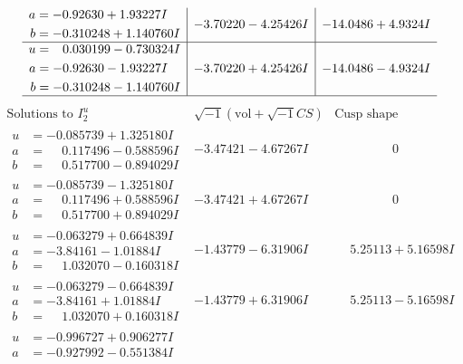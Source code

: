\documentclass[1p]{elsarticle_modified}
\theoremstyle{definition}
\newcommand{\I}{\sqrt{-1}}
\begin{document}
$$\begin{array}{c|c|c}
\begin{aligned}
a &= -0.92630 + 1.93227 I \\
b &= -0.310248 + 1.140760 I\end{aligned}
 & -3.70220 - 4.25426 I & -14.0486 + 4.9324 I \\ \hline\begin{aligned}
u &= \phantom{-}0.030199 - 0.730324 I \\
a &= -0.92630 - 1.93227 I \\
b &= -0.310248 - 1.140760 I\end{aligned}
 & -3.70220 + 4.25426 I & -14.0486 - 4.9324 I\\
 \hline 
 \end{array}$$\newpage$$\begin{array}{c|c|c}  
\text{Solutions to }I^u_{2}& \I (\text{vol} + \sqrt{-1}CS) & \text{Cusp shape}\\
 \hline 
\begin{aligned}
u &= -0.085739 + 1.325180 I \\
a &= \phantom{-}0.117496 - 0.588596 I \\
b &= \phantom{-}0.517700 - 0.894029 I\end{aligned}
 & -3.47421 - 4.67267 I & \phantom{-0.000000 } 0 \\ \hline\begin{aligned}
u &= -0.085739 - 1.325180 I \\
a &= \phantom{-}0.117496 + 0.588596 I \\
b &= \phantom{-}0.517700 + 0.894029 I\end{aligned}
 & -3.47421 + 4.67267 I & \phantom{-0.000000 } 0 \\ \hline\begin{aligned}
u &= -0.063279 + 0.664839 I \\
a &= -3.84161 - 1.01884 I \\
b &= \phantom{-}1.032070 - 0.160318 I\end{aligned}
 & -1.43779 - 6.31906 I & \phantom{-}5.25113 + 5.16598 I \\ \hline\begin{aligned}
u &= -0.063279 - 0.664839 I \\
a &= -3.84161 + 1.01884 I \\
b &= \phantom{-}1.032070 + 0.160318 I\end{aligned}
 & -1.43779 + 6.31906 I & \phantom{-}5.25113 - 5.16598 I \\ \hline\begin{aligned}
u &= -0.996727 + 0.906277 I \\
a &= -0.927992 - 0.551384 I \\

\end{aligned}
\end{array}$$
\end{document}
